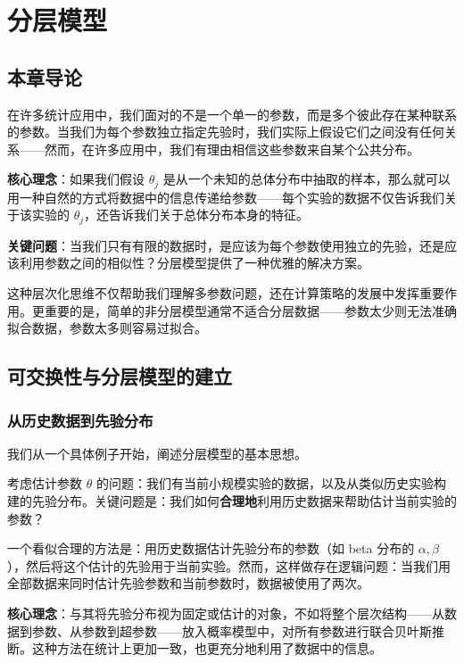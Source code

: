 
\chapter{分层模型}

\section{本章导论}

在许多统计应用中，我们面对的不是一个单一的参数，而是多个彼此存在某种联系的参数。当我们为每个参数独立指定先验时，我们实际上假设它们之间没有任何关系——然而，在许多应用中，我们有理由相信这些参数来自某个公共分布。

\textbf{核心理念}：如果我们假设 $\theta_j$ 是从一个未知的总体分布中抽取的样本，那么就可以用一种自然的方式将数据中的信息传递给参数——每个实验的数据不仅告诉我们关于该实验的 $\theta_j$，还告诉我们关于总体分布本身的特征。

\textbf{关键问题}：当我们只有有限的数据时，是应该为每个参数使用独立的先验，还是应该利用参数之间的相似性？分层模型提供了一种优雅的解决方案。

这种层次化思维不仅帮助我们理解多参数问题，还在计算策略的发展中发挥重要作用。更重要的是，简单的非分层模型通常不适合分层数据——参数太少则无法准确拟合数据，参数太多则容易过拟合。

\section{可交换性与分层模型的建立}

\subsection{从历史数据到先验分布}

我们从一个具体例子开始，阐述分层模型的基本思想。

考虑估计参数 $\theta$ 的问题：我们有当前小规模实验的数据，以及从类似历史实验构建的先验分布。关键问题是：我们如何\textbf{合理地}利用历史数据来帮助估计当前实验的参数？

一个看似合理的方法是：用历史数据估计先验分布的参数（如 beta 分布的 $\alpha, \beta$），然后将这个估计的先验用于当前实验。然而，这样做存在逻辑问题：当我们用全部数据来同时估计先验参数和当前参数时，数据被使用了两次。

\textbf{核心理念}：与其将先验分布视为固定或估计的对象，不如将整个层次结构——从数据到参数、从参数到超参数——放入概率模型中，对所有参数进行联合贝叶斯推断。这种方法在统计上更加一致，也更充分地利用了数据中的信息。

